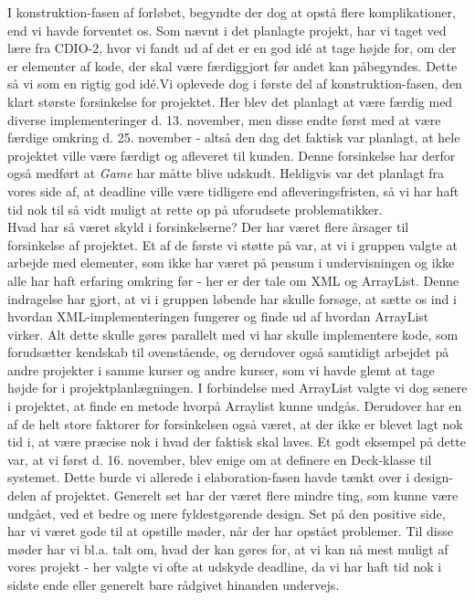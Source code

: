 \documentclass[../main.tex]{subfiles}
\begin{document}
\begin{flushleft}
I konstruktion-fasen af forløbet, begyndte der dog at opstå flere komplikationer, end vi havde forventet os. Som nævnt i det planlagte projekt, har vi taget ved lære fra CDIO-2, hvor vi fandt ud af det er en god idé at tage højde for, om der er elementer af kode, der skal være færdiggjort før andet kan påbegyndes. Dette så vi som en rigtig god idé.Vi oplevede dog i første del af konstruktion-fasen, den klart største forsinkelse for projektet. Her blev det planlagt at være færdig med diverse implementeringer d. 13. november, men disse endte først med at være færdige omkring d. 25. november - altså den dag det faktisk var planlagt, at hele projektet ville være færdigt og afleveret til kunden. Denne forsinkelse har derfor også medført at \textit{Game} har måtte blive udskudt. Heldigvis var det planlagt fra vores side af, at deadline ville være tidligere end afleveringsfristen, så vi har haft tid nok til så vidt muligt at rette op på uforudsete problematikker.\\ Hvad har så været skyld i forsinkelserne? Der har været flere årsager til forsinkelse af projektet. Et af de første vi støtte på var, at vi i gruppen valgte at arbejde med elementer, som ikke har været på pensum i undervisningen og ikke alle har haft erfaring omkring før - her er der tale om XML og ArrayList. Denne indragelse har gjort, at vi i gruppen løbende har skulle forsøge, at sætte os ind i hvordan XML-implementeringen fungerer og finde ud af hvordan ArrayList virker. Alt dette skulle gøres parallelt med vi har skulle implementere kode, som forudsætter kendskab til ovenstående, og derudover også samtidigt arbejdet på andre projekter i samme kurser og andre kurser, som vi havde glemt at tage højde for i projektplanlægningen. I forbindelse med ArrayList valgte vi dog senere i projektet, at finde en metode hvorpå Arraylist kunne undgås.\vspace{4mm}
Derudover har en af de helt store faktorer for forsinkelsen også været, at der ikke er blevet lagt nok tid i, at være præcise nok i hvad der faktisk skal laves. Et godt eksempel på dette var, at vi først d. 16. november, blev enige om at definere en Deck-klasse til systemet. Dette burde vi allerede i elaboration-fasen havde tænkt over i design-delen af projektet. Generelt set har der været flere mindre ting, som kunne være undgået, ved et bedre og mere fyldestgørende design. Set på den positive side, har vi været gode til at opstille møder, når der har opstået problemer. Til disse møder har vi bl.a. talt om, hvad der kan gøres for, at vi kan nå mest muligt af vores projekt - her valgte vi ofte at udskyde deadline, da vi har haft tid nok i sidste ende eller generelt bare rådgivet hinanden undervejs.\vspace{4mm}


\end{flushleft}
\end{document}
